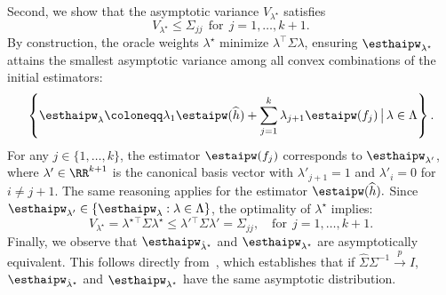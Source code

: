 Second, we show that the asymptotic variance \( V_{\lambda^\star} \) satisfies  
\[
V_{\lambda^\star} \leq \Sigma_{jj}~~ \text{for}~~j =1, \ldots, k+1.
\] By construction, the oracle weights \(\lambda^\star\) minimize \(\lambda^\top \Sigma \lambda\), ensuring \(\esthaipw_{\lambda^\star}\) attains the smallest asymptotic variance among all convex combinations of the initial estimators:  
\[
\left\{ \esthaipw_{\lambda} \coloneqq \lambda_1 \estaipw(\widehat h) + \sum_{j=1}^k \lambda_{j+1} \estaipw(f_j) \,\big|\, \lambda \in \Lambda \right\}.
\] 
For any \(j \in \{1,\ldots,k\}\), the estimator \(\estaipw(f_j)\) corresponds to \(\esthaipw_{\lambda'}\), where \(\lambda' \in \RR^{k+1}\) is the canonical basis vector with \(\lambda'_{j+1} = 1\) and \(\lambda'_i = 0\) for \(i \neq j+1\).  The same reasoning applies for the estimator $\estaipw(\widehat h).$ Since \(\esthaipw_{\lambda'} \in \{\esthaipw_{\lambda} : \lambda \in \Lambda\}\), the optimality of \(\lambda^\star\) implies:  
\[
V_{\lambda^\star} = \lambda^\star{}^\top \Sigma \lambda^\star \leq \lambda'{}^\top \Sigma \lambda' = \Sigma_{jj}, \quad \text{for}~~j=1,\ldots,k+1.
\]  
Finally, we observe that $\esthaipw_{\hat \lambda^\star}$ and $\esthaipw_{\lambda^\star}$ are asymptotically equivalent.
This follows directly from~\citet[Proposition 3.3]{lavancier2016general}, which establishes that if $\widehat \Sigma\Sigma^{-1}\overset{p}{\to}I$, $\esthaipw_{\hat \lambda^\star}$ and $\esthaipw_{\lambda^\star}$ have the same asymptotic distribution.





